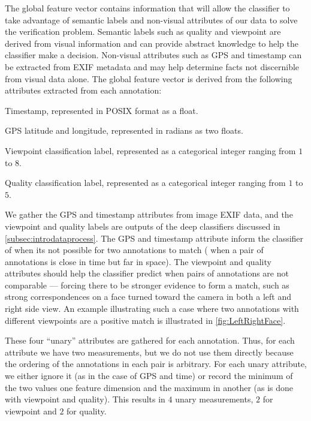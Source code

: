The global feature vector contains information that will allow the classifier to take advantage of semantic
  labels and non-visual attributes of our data to solve the verification problem.
Semantic labels such as quality and viewpoint are derived from visual information and can provide abstract
  knowledge to help the classifier make a decision.
Non-visual attributes such as GPS and timestamp can be extracted from EXIF metadata and may help determine facts
  not discernible from visual data alone.
The global feature vector is derived from the following attributes extracted from each annotation:
\begin{enumln}

    \item Timestamp, represented in POSIX format as a float.

    \item GPS latitude and longitude, represented in radians as two floats. 

    \item Viewpoint classification label, represented as a categorical integer ranging from $1$ to $8$.

    \item Quality classification label, represented as a categorical integer ranging from $1$ to $5$.
\end{enumln}
We gather the GPS and timestamp attributes from image EXIF data, and the viewpoint and quality labels are outputs
  of the deep classifiers discussed in \cref{subsec:introdataprocess}.
The GPS and timestamp attribute inform the classifier of when its not possible for two annotations to match
  (\eg{} when a pair of annotations is close in time but far in space).
The viewpoint and quality attributes should help the classifier predict when pairs of annotations are not
  comparable --- forcing there to be stronger evidence to form a match, such as strong correspondences on a face
  turned toward the camera in both a left and right side view.
An example illustrating such a case where two annotations with different viewpoints are a positive match is
  illustrated in \cref{fig:LeftRightFace}.

\LeftRightFace{}

These four ``unary'' attributes are gathered for each annotation.
Thus, for each attribute we have two measurements, but we do not use them directly because the ordering of the
  annotations in each pair is arbitrary.
For each unary attribute, we either ignore it (as in the case of GPS and time) or record the minimum of the two
  values one feature dimension and the maximum in another (as is done with viewpoint and quality).
This results in $4$ unary measurements, $2$ for viewpoint and $2$ for quality.

